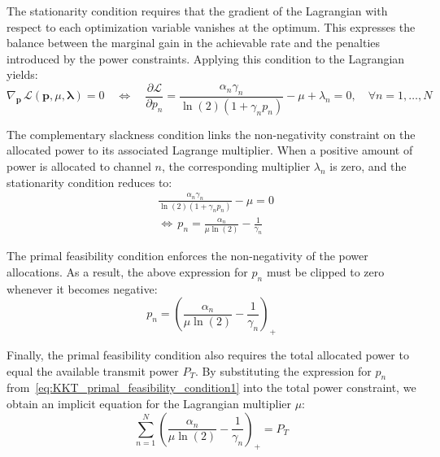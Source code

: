 The stationarity condition requires that the gradient of the Lagrangian with respect to each optimization variable vanishes at the optimum. This expresses the balance between the marginal gain in the achievable rate and the penalties introduced by the power constraints. Applying this condition to the Lagrangian yields:
\begin{equation}
\label{eq:KKT_stationarity_condition}
    \nabla_{\mathbf{p}} \, \mathcal{L}(\mathbf{p}, \mu, \boldsymbol{\lambda}) = 0
    \quad \iff \quad
    \frac{\partial \mathcal{L}}{\partial p_n} = \frac{\alpha_n \gamma_n}{\ln(2) \left( 1 + \gamma_n p_n \right)} - \mu + \lambda_n = 0, \quad \forall n = 1, \dots, N
\end{equation}

The complementary slackness condition links the non-negativity constraint on the allocated power to its associated Lagrange multiplier. When a positive amount of power is allocated to channel $n$, the corresponding multiplier $\lambda_n$ is zero, and the stationarity condition reduces to:
\begin{subequations}
\label{eq:KKT_complementary_slackness_condition}
\begin{align}
    & \frac{\alpha_n \gamma_n}{\ln(2) (1 + \gamma_n p_n)} - \mu = 0 \\
    & \iff \, p_n = \frac{\alpha_n}{\mu \ln(2)} - \frac{1}{\gamma_n}
\end{align}
\end{subequations}

The primal feasibility condition enforces the non-negativity of the power allocations. As a result, the above expression for $p_n$ must be clipped to zero whenever it becomes negative:
\begin{equation}
\label{eq:KKT_primal_feasibility_condition1}
    p_n = \left( \frac{\alpha_n}{\mu \ln(2)} - \frac{1}{\gamma_n} \right)_{+}
\end{equation}

Finally, the primal feasibility condition also requires the total allocated power to equal the available transmit power $P_T$. By substituting the expression for $p_n$ from~\eqref{eq:KKT_primal_feasibility_condition1} into the total power constraint, we obtain an implicit equation for the Lagrangian multiplier $\mu$:
\begin{equation}
\label{eq:KKT_primal_feasibility_condition2}
    \sum_{n=1}^{N} \left( \frac{\alpha_n}{\mu \ln(2)} - \frac{1}{\gamma_n} \right)_{+} = P_T
\end{equation}

